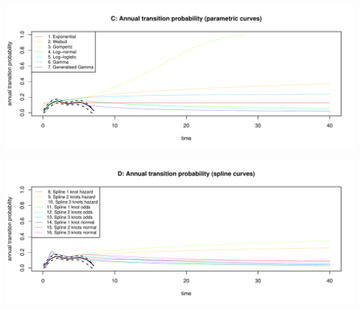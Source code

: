 \documentclass[
]{article}
\begin{document}
\begin{flushleft}\includegraphics[height=0.29\textheight]{Images/validate_extrapolation2-3} \end{flushleft}

\begin{flushleft}\includegraphics[height=0.29\textheight]{Images/validate_extrapolation2-4} \end{flushleft}
\end{document}
